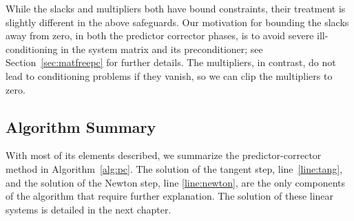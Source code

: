 While the slacks and multipliers both have bound constraints, their treatment is
slightly different in the above safeguards.  Our motivation for bounding the
slacks away from zero, in both the predictor corrector phases, is to avoid
severe ill-conditioning in the system matrix and its preconditioner; see
Section~\ref{sec:matfreepc} for further details.  The multipliers, in contrast,
do not lead to conditioning problems if they vanish, so we can clip the
multipliers to zero.

\subsection{Algorithm Summary}

With most of its elements described, we summarize the predictor-corrector method
in Algorithm~\ref{alg:pc}.  The solution of the tangent step,
line~\ref{line:tang}, and the solution of the Newton step, line
\ref{line:newton}, are the only components of the algorithm that require further
explanation.  The solution of these linear systems is detailed in the next chapter.

